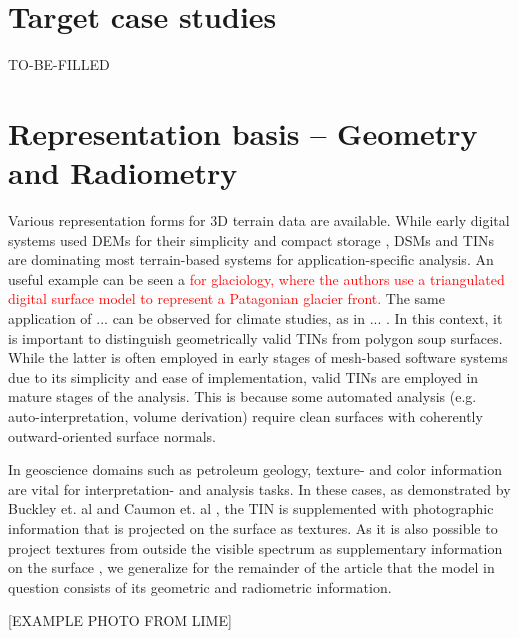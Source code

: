 \documentclass[review]{elsarticle}
\begin{document}
\section{Target case studies}
\label{sec:case_studies}

TO-BE-FILLED

\section{Representation basis -- Geometry and Radiometry}
\label{sec:representations}

Various representation forms for 3D terrain data are available. While early digital systems used \glspl{DEM} for their simplicity and compact storage \cite{Trinks2005,McCaffrey2005}, \glspl{DSM} and \glspl{TIN} are dominating most terrain-based systems for application-specific analysis. An useful example can be seen a  \textcolor{red}{ \cite{Schwalbe2017b} for glaciology, where the authors use a  triangulated digital surface model to represent a Patagonian glacier front.} The same application of ... can be observed for climate studies, as in ... . In this context, it is important to distinguish geometrically valid \glspl{TIN} from polygon soup surfaces. While the latter is often employed in early stages of mesh-based software systems due to its simplicity and ease of implementation, valid \glspl{TIN} are employed in mature stages of the analysis. This is because some automated analysis (e.g. auto-interpretation, volume derivation) require clean surfaces with coherently outward-oriented surface normals.

In geoscience domains such as petroleum geology, texture- and color information are vital for interpretation- and analysis tasks. In these cases, as demonstrated by Buckley et. al \cite{Buckley2008a} and Caumon et. al \cite{Caumon2013}, the \gls{TIN} is supplemented with photographic information that is projected on the surface as textures. As it is also possible to project textures from outside the visible spectrum as supplementary information on the surface \cite{Kurz2011}, we generalize for the remainder of the article that the model in question consists of its geometric and radiometric information.

[EXAMPLE PHOTO FROM LIME]
\end{document}
